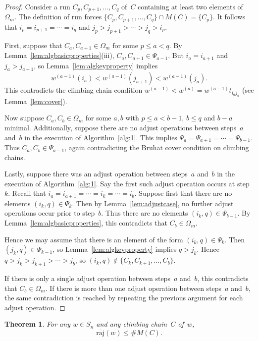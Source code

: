 \documentclass[10pt,a4paper]{amsart}
\newcommand{\absoverrajcode}[1]{\overline{\mathrm{raj}}(#1)}
\newtheorem{theorem}{Theorem}[section]
\begin{document}
\begin{proof}
	Consider a run $C_{p},C_{p+1},\ldots,C_{q}$ of~$C$ containing at least two elements of $\Omega_m$. The definition of run forces $\{C_p,C_{p+1},\ldots,C_q\}\cap M(C) = \{C_p\}$. It follows that $i_p=i_{p+1}=\cdots=i_{q}$ and $j_p>j_{p+1}>\cdots>j_q>i_p$. 
	
	First, suppose that $C_a,C_{a+1}\in \Omega_m$ for some $p\leq a< q$. By Lemma~\ref{lem:algbasicproperties}(iii), $C_a,C_{a+1}\in \Psi_{a-1}$. But $i_a=i_{a+1}$ and $j_a>j_{a+1}$, so Lemma~\ref{lem:algkeyproperty} implies
	\[w^{(a-1)}(i_a) < w^{(a-1)}(j_{a+1}) < w^{(a-1)}(j_a). \]
	This contradicts the climbing chain condition $w^{(a-1)}\lessdot w^{(a)} = w^{(a-1)}t_{i_aj_a}$ (see Lemma~\ref{lem:cover}).
	
	Now suppose $C_a,C_b\in \Omega_m$ for some $a,b$ with $p\leq a<b-1$, $b\leq q$ and $b-a$ minimal. Additionally, suppose there are no adjust operations between steps~$a$ and~$b$ in the execution of Algorithm~\ref{alg:1}. This implies $\Psi_a=\Psi_{a+1}=\cdots=\Psi_{b-1}$. Thus $C_a,C_b\in \Psi_{a-1}$, again contradicting the Bruhat cover condition on climbing chains.
	
	Lastly, suppose there was an adjust operation between steps~$a$ and~$b$ in the execution of Algorithm~\ref{alg:1}. Say the first such adjust operation occurs at step~$k$. Recall that $i_a=i_{a+1}=\cdots=i_k=\cdots=i_b$. Suppose first that there are no elements $(i_k,q)\in \Psi_{k}$. Then by Lemma~\ref{lem:adjustcase}, no further adjust operations occur prior to step~$b$. Thus there are no elements $(i_k,q)\in \Psi_{b-1}$. By Lemma~\ref{lem:algbasicproperties}, this contradicts that $C_b\in \Omega_m$.
	
	Hence we may assume that there is an element of the form $(i_k,q)\in \Psi_k$. Then $(j_k,q)\in \Psi_{k-1}$, so Lemma~\ref{lem:algkeyproperty} implies $q>j_k$. Hence $q>j_k>j_{k+1}>\cdots>j_b$, so $(i_k,q)\notin \{C_k,C_{k+1},\ldots,C_{b}\}$. 
	
	If there is only a single adjust operation between steps~$a$ and~$b$, this contradicts that $C_b\in \Omega_m$. If there is more than one adjust operation between steps~$a$ and~$b$, the same contradiction is reached by repeating the previous argument for each adjust operation. 
\end{proof}

\setcounter{section}{8}\setcounter{theorem}{8}
\begin{theorem}
	\label{prop:minnummarks}
	For any $w\in S_n$ and any climbing chain~$C$ of~$w$, 
	\[\absoverrajcode{w} \leq \#M(C). \]
\end{theorem}
\end{document}
